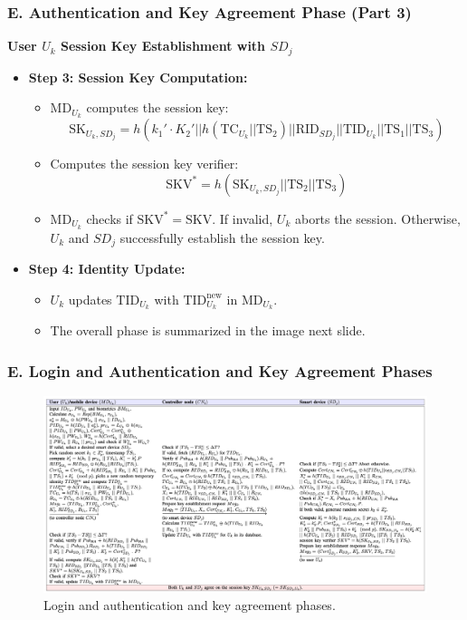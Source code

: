 \documentclass[9pt,handout]{beamer}
\begin{document}
\begin{frame}
    \frametitle{E. Authentication and Key Agreement Phase (Part 3)}

    \textbf{User \( U_k \) Session Key Establishment with \( SD_j \)}

    
        \begin{itemize}
            
            \item \textbf{Step 3: Session Key Computation:}
            \begin{itemize}
                \item \( \text{MD}_{U_k} \) computes the session key:
                \[
                \text{SK}_{U_k, SD_j} = h(k_1' \cdot K_2' || h(\text{TC}_{U_k} || \text{TS}_2) || \text{RID}_{SD_j} || \text{TID}_{U_k} || \text{TS}_1 || \text{TS}_3)
                \]
                \item Computes the session key verifier:
                \[
                \text{SKV}^* = h(\text{SK}_{U_k, SD_j} || \text{TS}_2 || \text{TS}_3)
                \]
                \item \( \text{MD}_{U_k} \) checks if \( \text{SKV}^* = \text{SKV} \). If invalid, \( U_k \) aborts the session. Otherwise, \( U_k \) and \( SD_j \) successfully establish the session key.
            \end{itemize}

            \item \textbf{Step 4: Identity Update:}
            \begin{itemize}
                \item \( U_k \) updates \( \text{TID}_{U_k} \) with \( \text{TID}_{U_k}^{\text{new}} \) in \( \text{MD}_{U_k} \).
                \item The overall phase is summarized in the image next slide.
            \end{itemize}
        \end{itemize}
    
\end{frame}

\begin{frame}
    \frametitle{E. Login and Authentication and Key Agreement Phases}
    
    \begin{figure}
        \centering
        \includegraphics[width=\textwidth]{Esteap.png} 
        \caption{Login and authentication and key agreement phases.}
    \end{figure}
\end{frame}
\end{document}
